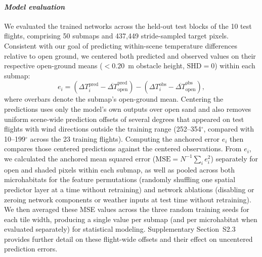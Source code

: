 \documentclass[12pt]{article}
\begin{document}
\paragraph*{\textit{Model evaluation}}
We evaluated the trained networks across the held-out test blocks of the 10 test flights, comprising 50 submaps and 437,449 stride-sampled target pixels. Consistent with our goal of predicting within-scene temperature differences relative to open ground, we centered both predicted and observed values on their respective open-ground means ($<0.20$~m obstacle height, $\text{SHD}=0$) within each submap:
\begin{equation} \label{eq:anchored_error}
e_i = \left(\Delta T_i^\text{pred} - \overline{\Delta T}^\text{pred}_\text{open}\right) - \left(\Delta T_i^\text{obs} - \overline{\Delta T}^\text{obs}_\text{open}\right),
\end{equation}
where overbars denote the submap's open-ground mean. Centering the predictions uses only the model's own outputs over open sand and also removes uniform scene-wide prediction offsets of several degrees that appeared on test flights with wind directions outside the training range (252--354$^\circ$, compared with 10--199$^\circ$ across the 23 training flights). Computing the anchored error $e_i$ then compares those centered predictions against the centered observations. From $e_i$, we calculated the anchored mean squared error ($\text{MSE} = N^{-1}\sum_i e_i^2$) separately for open and shaded pixels within each submap, as well as pooled across both microhabitats for the feature permutations (randomly shuffling one spatial predictor layer at a time without retraining) and network ablations (disabling or zeroing network components or weather inputs at test time without retraining). We then averaged these MSE values across the three random training seeds for each tile width, producing a single value per submap (and per microhabitat when evaluated separately) for statistical modeling. Supplementary Section~S2.3 provides further detail on these flight-wide offsets and their effect on uncentered prediction errors.
\end{document}
